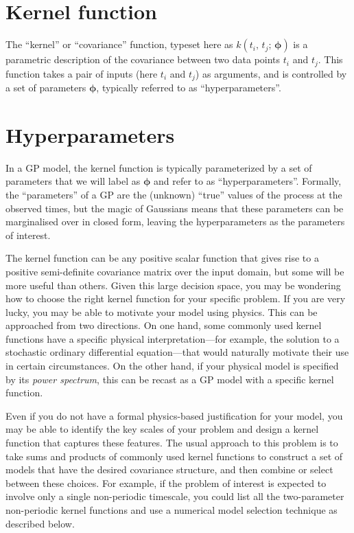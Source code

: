 \documentclass[letterpaper]{ar-1col}
\newcommand{\suz}[1]{\textcolor{magenta}{#1}}
\newcommand{\hyperparams}{\ensuremath{\boldsymbol{\phi}}}
\begin{document}
\begin{textbox}[htb]
  \section{Kernel function}
  The ``kernel'' or ``covariance'' function, typeset here as $k(t_i,\,t_j;\,\hyperparams)$ is a parametric description of the covariance between two data points $t_i$ and $t_j$. This function takes a pair of inputs (here $t_i$ and $t_j$) as arguments, and is controlled by a set of parameters $\hyperparams$, typically referred to as ``hyperparameters''.

  \vspace{1.5em}

  \section{Hyperparameters}
  In a GP model, the kernel function is typically parameterized by a set of parameters that we will label as $\hyperparams$ and refer to as ``hyperparameters''.
  Formally, the ``parameters'' of a GP are the (unknown) ``true'' values of the process at the observed times, but the magic of Gaussians means that these parameters can be marginalised over in closed form, leaving the hyperparameters as the parameters of interest.
\end{textbox}

The kernel function can be any positive scalar function that gives rise to a positive semi-definite covariance matrix over the input domain, but some will be more useful than others.
Given this large decision space, you may be wondering how to choose the right kernel function for your specific problem.
If you are very lucky, you may be able to motivate your model using physics.
This can be approached from two directions.
On one hand, some commonly used kernel functions have a specific physical interpretation---for example, the solution to a stochastic ordinary differential equation---that would naturally motivate their use in certain circumstances.
On the other hand, if your physical model is specified by its \emph{power spectrum}, this can be recast as a GP model with a specific kernel function.

Even if you do not have a formal physics-based justification for your model, you may be able to identify the key scales of your problem and design a kernel function that captures these features.
The usual approach to this problem is to take sums and products of commonly used kernel functions to construct a set of models that have the desired covariance structure, and then combine or select between these choices.
For example, if the problem of interest is expected to involve only a single non-periodic timescale, you could list all the two-parameter non-periodic kernel functions and use a numerical model selection technique as described below.
\end{document}
